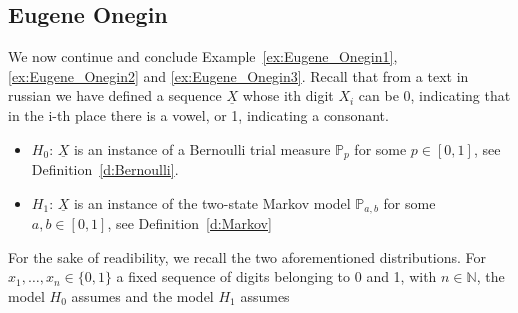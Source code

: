 	\subsection{ Eugene Onegin}
	\label{ss:Eugene_Onegin4}
	We now continue and conclude Example~\ref{ex:Eugene_Onegin1}, \ref{ex:Eugene_Onegin2} and \ref{ex:Eugene_Onegin3}. 
Recall that from a text in russian we have defined a sequence $\underline X$ whose ith digit $X_i$ can be 0, indicating that in the i-th place there is a vowel, or 1, indicating a consonant.
%
%
	\begin{itemize}
		\item $H_0$: $\underline X$ is an instance of a Bernoulli trial measure $\mathbb P_p$ for some $p \in [0,1]$, see Definition~\ref{d:Bernoulli}.
		\item $H_1$: $\underline X$ is an instance of the two-state Markov model $\mathbb P_{a,b}$ for some $a,b \in [0,1]$, see Definition~\ref{d:Markov}   
	\end{itemize}
	For the sake of readibility, we recall the two aforementioned distributions. For $x_1, \ldots, x_n \in\{0,1\}$ a fixed sequence of digits belonging to 0 and 1, with $n \in \mathbb N$, the model $H_0$ assumes   
	and the model $H_1$ assumes 

